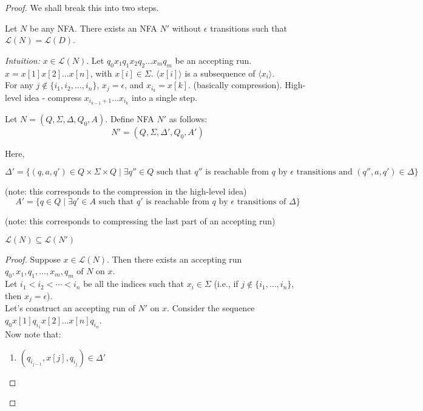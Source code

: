 \documentclass[a4paper]{article}
\newcommand{\mc}{\mathcal}
\begin{document}
\begin{proof}
    We shall break this into two steps.
    \begin{theorem}
        Let $N$ be any NFA. There exists an NFA $N'$ without $\epsilon$ transitions such that $\mc{L}(N) = \mc{L}(D)$.
    \end{theorem}


    \textit{Intuition:} 
    $x \in \mc{L}(N)$. Let $q_0 x_1 q_1 x_2 q_2 \ldots x_m q_m$ be an accepting run.\\
    $x = x[1] x[2] \ldots x[n]$, with $x[i] \in \Sigma$.
    $\langle x[i] \rangle$ is a subsequence of $\langle x_i \rangle$.\\
    For any $j \not \in \{i_1, i_2, \ldots, i_n\}$, $x_j = \epsilon$, and $x_{i_k} = x[k]$. (basically compression).
    High-level idea - compress $x_{i_{k - 1} + 1} \ldots x_{i_k}$ into a single step.



    Let $N = (Q, \Sigma, \Delta, Q_0, A)$. Define NFA $N'$ as follows:\\

    $$N' = (Q, \Sigma, \Delta', Q_0, A')$$

    Here, 

    \[
        \Delta' = \{(q, a, q') \in Q \times \Sigma \times Q \mid \exists q'' \in Q \text{ such that } q''  \text{ is reachable from } q \text{ by } \epsilon \text{ transitions and } (q'', a, q') \in \Delta \}
    \]

    (note: this corresponds to the compression in the high-level idea)\\

    $$A' = \{q \in Q \mid \exists q' \in A \text{ such that } q' \text{ is reachable from } q \text{ by } \epsilon \text{ transitions of } \Delta\}$$

    (note: this corresponds to compressing the last part of an accepting run)\\

    \begin{claim}
        $\mc{L}(N) \subseteq \mc{L}(N')$
    \end{claim}


    \begin{proof}
        Suppose $x \in \mc{L}(N)$. Then there exists an accepting run $q_0, x_1, q_1, \ldots, x_m, q_m$ of $N$ on $x$.\\
        Let $i_1 < i_2 < \cdots < i_n$ be all the indices such that $x_i \in \Sigma$ (i.e., if $j \not \in \{i_1, \ldots, i_n\}$, then $x_j = \epsilon$).\\
        Let's construct an accepting run of $N'$ on $x$. Consider the sequence $q_0 x[1] q_{i_1} x[2] \ldots x[n] q_{i_n}$.\\
        Now note that:
        \begin{enumerate}
            \item $(q_{i_{j - 1}}, x[j], q_{i_j}) \in \Delta'$


\end{enumerate}
\end{proof}
\end{proof}
\end{document}
